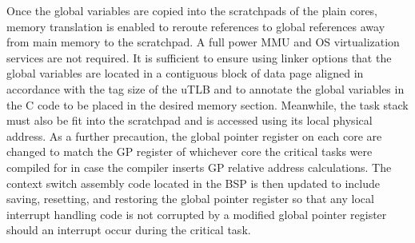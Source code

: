 Once the global variables are copied into the scratchpads of the plain cores, memory translation is enabled to reroute references to global references away from main memory to the scratchpad. A full power MMU and OS virtualization services are not required. It is sufficient to ensure using linker options that the global variables are located in a contiguous block of data page aligned in accordance with the tag size of the uTLB and to annotate the global variables in the C code to be placed in the desired memory section. Meanwhile, the task stack must also be fit into the scratchpad and is accessed using its local physical address. As a further precaution, the global pointer register on each core are changed to match the GP register of whichever core the critical tasks were compiled for in case the compiler inserts GP relative address calculations. The context switch assembly code located in the BSP is then updated to include saving, resetting, and restoring the global pointer register so that any local interrupt handling code is not corrupted by a modified global pointer register should an interrupt occur during the critical task.